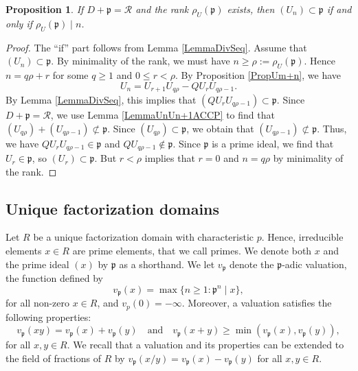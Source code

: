 \documentclass[reqno]{amsart}
\newtheorem{proposition}{Proposition}
\begin{document}
\begin{proposition}\label{PropPdivUrhodivn}
    If $D+\mathfrak{p}=\mathscr{R}$ and the rank $\rho_U(\mathfrak{p})$ exists, then $(U_n)\subset \mathfrak{p}$ if and only if $\rho_U(\mathfrak{p})\mid n$.
\end{proposition}


\begin{proof}
    The ``if'' part follows from Lemma \ref{LemmaDivSeq}. Assume that $(U_n)\subset \mathfrak{p}$. By minimality of the rank, we must have $n\geq \rho:=\rho_U(\mathfrak{p})$. Hence $n=q\rho+r$ for some $q\geq 1$ and $0\leq r <\rho$. By Proposition \ref{PropUm+n}, we have
    \[
    U_n=U_{r+1}U_{q \rho } -Q U_r U_{q\rho -1}.
    \]
    By Lemma \ref{LemmaDivSeq}, this implies that $(Q U_r U_{q\rho -1}) \subset \mathfrak{p}$. Since $D+ \mathfrak{p}=\mathscr{R}$, we use Lemma \ref{LemmaUnUn+1ACCP} to find that $(U_{q \rho}) + (U_{q\rho -1}) \not \subset \mathfrak{p}$. Since $(U_{q \rho}) \subset \mathfrak{p}$, we obtain that $(U_{q\rho -1}) \not \subset \mathfrak{p}$. Thus, we have $Q U_r U_{q\rho -1} \in \mathfrak{p}$ and $Q U_{q\rho -1} \not \in \mathfrak{p}$. Since $\mathfrak{p}$ is a prime ideal, we find that $U_r\in \mathfrak{p}$, so $(U_r) \subset \mathfrak{p}$. But $r<\rho$ implies that $r=0$ and $n=q\rho$ by minimality of the rank.
\end{proof}




\subsection{Unique factorization domains}


Let $R$ be a unique factorization domain with characteristic $p$. Hence, irreducible elements $x\in R$ are prime elements, that we call primes. We denote both $x$ and the prime ideal $(x)$ by $\mathfrak{p}$ as a shorthand. We let $v_\mathfrak{p}$ denote the $\mathfrak{p}$-adic valuation, the function defined by
\[
v_\mathfrak{p}(x) = \max\{n\geq 1 : \mathfrak{p}^n \mid x\},
\]
for all non-zero $x\in R$, and $v_{p}(0)=-\infty$. Moreover, a valuation satisfies the following properties:
\[
v_\mathfrak{p}(xy)=v_\mathfrak{p}(x)+v_\mathfrak{p}(y) \quad \text{and} \quad v_\mathfrak{p}(x+y)\geq \min(v_\mathfrak{p}(x), v_\mathfrak{p}(y) ),
\]
for all $x,y\in R$. We recall that a valuation and its properties can be extended to the field of fractions of $R$ by $v_\mathfrak{p}(x/y) = v_\mathfrak{p}(x)-v_\mathfrak{p}(y)$ for all $x,y\in R$.
\end{document}
